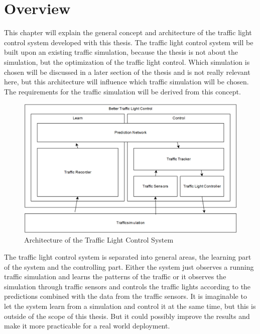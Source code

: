\section{Overview}

This chapter will explain the general concept and architecture of the traffic light control system developed with this thesis. The traffic light control system will be built upon an existing traffic simulation, because the thesis is not about the simulation, but the optimization of the traffic light control. Which simulation is chosen will be discussed in a later section of the thesis and is not really relevant here, but this architecture will influence which traffic simulation will be chosen. The requirements for the traffic simulation will be derived from this concept.

\begin{figure}[ht]
  \centering
  \includegraphics[width=16cm]{figures/architecture}
  \caption[Architecture of the Traffic Light Control System]{Architecture of the Traffic Light Control System \protect\footnotemark}
  \label{architecture}
\end{figure}


The traffic light control system is separated into general areas, the learning part of the system and the controlling part. Either the system just observes a running traffic simulation and learns the patterns of the traffic or it observes the simulation through traffic sensors and controls the traffic lights according to the predictions combined with the data from the traffic sensors. It is imaginable to let the system learn from a simulation and control it at the same time, but this is outside of the scope of this thesis. But it could possibly improve the results and make it more practicable for a real world deployment.

